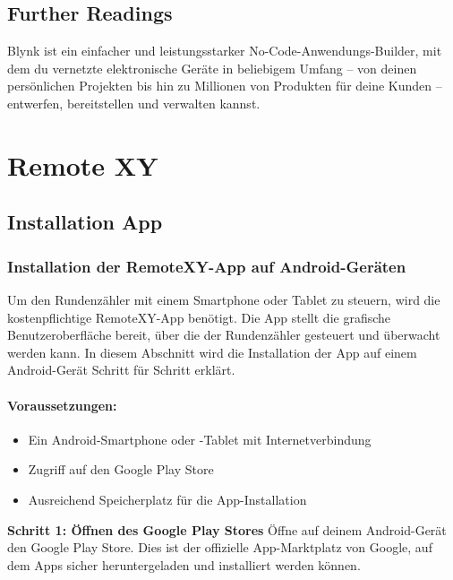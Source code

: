 \section{Further Readings}


Blynk ist ein einfacher und leistungsstarker No-Code-Anwendungs-Builder, mit dem du vernetzte elektronische Geräte in beliebigem Umfang – von deinen persönlichen Projekten bis hin zu Millionen von Produkten für deine Kunden – entwerfen, bereitstellen und verwalten kannst. \cite{Blynk:2025}



\chapter{Remote XY}\label{RemoteXY}

\section{Installation App}

\subsection {Installation der RemoteXY-App auf Android-Geräten}

Um den Rundenzähler mit einem Smartphone oder Tablet zu steuern, wird die kostenpflichtige RemoteXY-App benötigt. Die App stellt die grafische Benutzeroberfläche bereit, über die der Rundenzähler gesteuert und überwacht werden kann. In diesem Abschnitt wird die Installation der App auf einem Android-Gerät Schritt für Schritt erklärt. 


\subsubsection{Voraussetzungen:}

\begin{itemize}
	\item Ein Android-Smartphone oder -Tablet mit Internetverbindung
	\item Zugriff auf den Google Play Store
	\item Ausreichend Speicherplatz für die App-Installation
\end{itemize}

\textbf{Schritt 1: Öffnen des Google Play Stores}
Öffne auf deinem Android-Gerät den Google Play Store. Dies ist der offizielle App-Marktplatz von Google, auf dem Apps sicher heruntergeladen und installiert werden können. 

